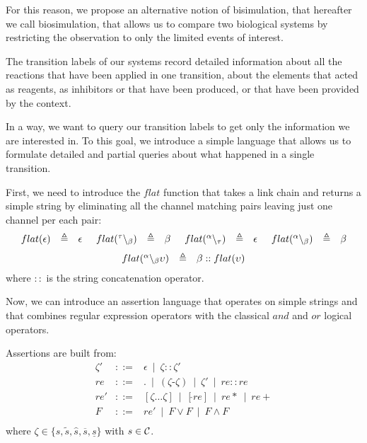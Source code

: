 For this reason, we propose an alternative notion of bisimulation, that hereafter we call biosimulation,
that allows us  to compare two biological systems by restricting the observation to only the limited events of interest.

The transition labels of our systems record detailed information about all the reactions that have been applied in one transition, about the elements that acted as reagents, as inhibitors or that have been produced, or that have been provided by the context.

In a way, we want to query our transition labels to get only the information we are interested in.
To this goal, we introduce a simple language
that allows us to formulate detailed and partial queries about what happened in a single transition.

First, we need to introduce the $flat$ function that takes a link chain and returns a simple string
by eliminating all the channel matching pairs leaving just one channel per each pair:\\
\[
\begin{array}{lcl@{\hspace{0.5cm}}lcl@{\hspace{0.5cm}}lcl@{\hspace{0.5cm}}lcl}
flat(\epsilon)&\defeq & \epsilon &
flat(\link{\silent}{\beta}) & \defeq & \beta &
flat(\link{\alpha}{\silent})& \defeq & \epsilon &
flat(\link{\alpha}{\beta}) & \defeq &\beta \\
\end{array}\]
\[
\begin{array}{lcl}
flat({}^{\alpha} \backslash_{\beta}\upsilon)& \triangleq & \beta :: flat(\upsilon)\\
\end{array}\\
\]
where  $::$ is the string concatenation operator.


\noindent
Now, we can introduce an assertion language that operates on simple strings
and that combines regular expression operators with the classical $and$ and $or$ logical
operators.


\begin{definition}
\label{def:assetionl}
Assertions are built from: 
$$
\begin{array}{lcl}
\zeta' &::= & \epsilon  ~\mid~ \zeta::\zeta'\\ 
re&::=& . ~\mid ~   (\zeta \textrm{-}\zeta)  ~\mid ~ \zeta' ~\mid ~ re::re\\
re' &::= & 
[\zeta\dots\zeta]~\mid~ [\hat{}  re] ~\mid ~ re* ~\mid ~ re+ \\
F &::=& re' ~\mid ~  F \vee F ~\mid ~  F \wedge F\\
\end{array}
$$
where $\zeta \in \{s, \tilde{s}, \hat{s}, \overline{s}, \underline{s} \}$ with  $s \in {\cal C}$.
\end{definition}

